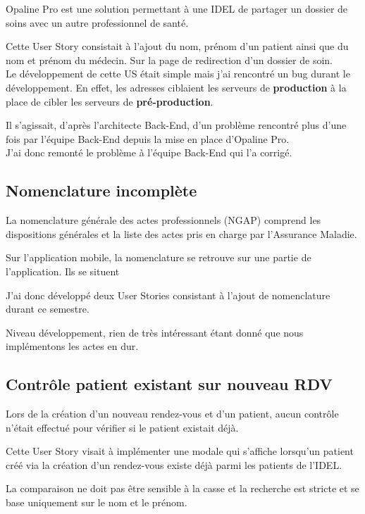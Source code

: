 \documentclass{article}
\begin{document}
Opaline Pro est une solution permettant à une IDEL de partager un dossier de soins avec un autre professionnel de santé.

Cette User Story consistait à l'ajout du nom, prénom d'un patient ainsi que du nom et prénom du médecin. Sur la page de redirection d'un dossier de soin. \\

Le développement de cette US était simple mais j'ai rencontré un bug durant le développement. En effet, les adresses ciblaient les serveurs de \textbf{production} à la place de cibler les serveurs de \textbf{pré-production}.

Il s'agissait, d'après l'architecte Back-End, d'un problème rencontré plus d'une fois par l'équipe Back-End depuis la mise en place d'Opaline Pro. \\

J'ai donc remonté le problème à l'équipe Back-End qui l'a corrigé.

\subsection{Nomenclature incomplète}

La nomenclature générale des actes professionnels (NGAP) comprend les dispositions générales et la liste des actes pris en charge par l'Assurance Maladie.

Sur l'application mobile, la nomenclature se retrouve sur une partie de l'application. Ils se situent 

J'ai donc développé deux User Stories consistant à l'ajout de nomenclature durant ce semestre.

Niveau développement, rien de très intéressant étant donné que nous implémentons les actes en dur.

\subsection{Contrôle patient existant sur nouveau RDV}

Lors de la création d'un nouveau rendez-vous et d'un patient, aucun contrôle n'était effectué pour vérifier si le patient existait déjà.

Cette User Story visait à implémenter une modale qui s'affiche lorsqu'un patient créé via la création d'un rendez-vous existe déjà parmi les patients de l'IDEL.


La comparaison ne doit pas être sensible à la casse et la recherche est stricte et se base uniquement sur le nom et le prénom.
\end{document}
